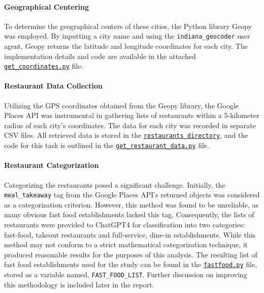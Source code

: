 \documentclass[12pt]{article}
\begin{document}
\paragraph{Geographical Centering}
To determine the geographical centers of these cities, the Python library Geopy was employed. By inputting a city name and using the \texttt{indiana\_geocoder} user agent, Geopy returns the latitude and longitude coordinates for each city. The implementation details and code are available in the attached \href{https://github.com/cucupac/bayesian-stats/blob/main/project/data_collection/get_coordinates.py}{\texttt{get\_coordinates.py}} file.


\paragraph{Restaurant Data Collection}
Utilizing the GPS coordinates obtained from the Geopy library, the Google Places API was instrumental in gathering lists of restaurants within a 5-kilometer radius of each city's coordinates. The data for each city was recorded in separate CSV files. All retrieved data is stored in the \href{https://github.com/cucupac/bayesian-stats/tree/main/project/restaurants}{\texttt{restaurants directory}}, and the code for this task is outlined in the \href{https://github.com/cucupac/bayesian-stats/blob/main/project/data_collection/get_restaurant_data.py}{\texttt{get\_restaurant\_data.py}} file.

\paragraph{Restaurant Categorization}
Categorizing the restaurants posed a significant challenge. Initially, the \texttt{meal\_takeaway} tag from the Google Places API's returned objects was considered as a categorization criterion. However, this method was found to be unreliable, as many obvious fast food establishments lacked this tag. Consequently, the lists of restaurants were provided to ChatGPT4 for classification into two categories: fast-food, takeout restaurants and full-service, dine-in establishments. While this method may not conform to a strict mathematical categorization technique, it produced reasonable results for the purposes of this analysis. The resulting list of fast food establishments used for the study can be found in the \href{https://github.com/cucupac/bayesian-stats/blob/main/project/data_collection/fastfood.py}{\texttt{fastfood.py}} file, stored as a variable named, \texttt{FAST\_FOOD\_LIST}. Further discussion on improving this methodology is included later in the report.
\end{document}
